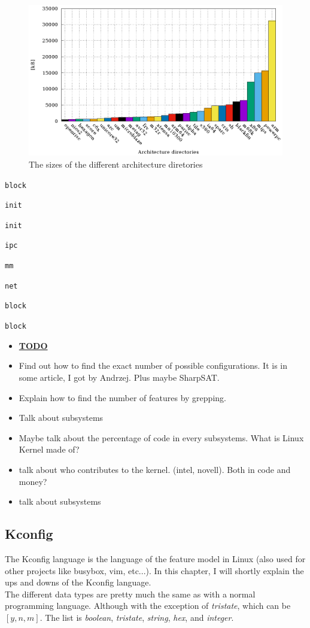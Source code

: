\documentclass[a4paper,11pt]{article}
\newcommand{\textcode}[1]{
    \texttt{\colorbox{gray!20}{#1}}
}
\newcommand{\figa}{
    \begin{figure}[!htpb]
    \centering
}
\newcommand{\figb}[2]{
    \caption{#1}
    \label{#2}
    \end{figure}
}
\begin{document}
\figa
    \includegraphics{plots/archsizes.eps}
\figb{The sizes of the different architecture diretories}{fig:archsizes}


\textcode{block}
\textcode{init}
\textcode{init}
\textcode{ipc}
\textcode{mm}
\textcode{net}
\textcode{block}
\textcode{block}

\begin{itemize}
    \item \underline{\textbf{TODO}}
    \item Find out how to find the exact number of possible configurations. It 
        is in some article, I got by Andrzej. Plus maybe SharpSAT.
    \item Explain how to find the number of features by grepping.
    \item Talk about subsystems
    \item Maybe talk about the percentage of code in every subsystems. What is 
        Linux Kernel made of?
    \item talk about who contributes to the kernel. (intel, novell). Both in 
        code and money?
    \item talk about subsystems
\end{itemize}


\subsection{Kconfig}

The Kconfig language is the language of the feature model in Linux (also used 
for other projects like busybox, vim, etc...). In this chapter, I will shortly 
explain the ups and downs of the Kconfig language. \\


The different data types are pretty much the same as with a normal programming 
language. Although with the exception of \emph{tristate}, which can be $[y, n, 
m]$. The list is \emph{boolean}, \emph{tristate}, \emph{string}, \emph{hex}, 
and \emph{integer}.
\end{document}

